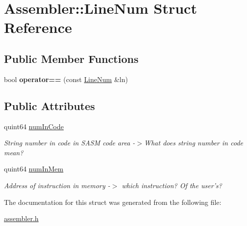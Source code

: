 \hypertarget{struct_assembler_1_1_line_num}{}\section{Assembler\+:\+:Line\+Num Struct Reference}
\label{struct_assembler_1_1_line_num}
\subsection*{Public Member Functions}
\begin{DoxyCompactItemize}
\item 
\hypertarget{struct_assembler_1_1_line_num_af687ddb816dcd5c29f896cae92e6d7b5}{}bool {\bfseries operator==} (const \hyperlink{struct_assembler_1_1_line_num}{Line\+Num} \&ln)\label{struct_assembler_1_1_line_num_af687ddb816dcd5c29f896cae92e6d7b5}

\end{DoxyCompactItemize}
\subsection*{Public Attributes}
\begin{DoxyCompactItemize}
\item 
\hypertarget{struct_assembler_1_1_line_num_ae5d6969a723ee8e06940233863fcd8e4}{}quint64 \hyperlink{struct_assembler_1_1_line_num_ae5d6969a723ee8e06940233863fcd8e4}{num\+In\+Code}\label{struct_assembler_1_1_line_num_ae5d6969a723ee8e06940233863fcd8e4}

\begin{DoxyCompactList}\small\item\em String number in code in S\+A\+S\+M code area -\/$>$What does string number in code mean? \end{DoxyCompactList}\item 
\hypertarget{struct_assembler_1_1_line_num_a6ae7b98e18a63f558aff59cce0810aac}{}quint64 \hyperlink{struct_assembler_1_1_line_num_a6ae7b98e18a63f558aff59cce0810aac}{num\+In\+Mem}\label{struct_assembler_1_1_line_num_a6ae7b98e18a63f558aff59cce0810aac}

\begin{DoxyCompactList}\small\item\em Address of instruction in memory -\/$>$ which instruction? Of the user's? \end{DoxyCompactList}\end{DoxyCompactItemize}


The documentation for this struct was generated from the following file\+:\begin{DoxyCompactItemize}
\item 
\hyperlink{assembler_8h}{assembler.\+h}\end{DoxyCompactItemize}
